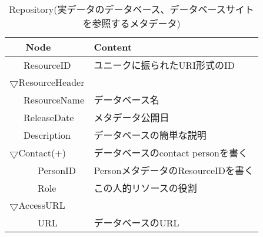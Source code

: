 \begin{table}[ht]
\begin{center}
{\scriptsize
\caption{Repository(実データのデータベース、データベースサイトを参照するメタデータ)}
\begin{tabular}{ll}\hline
\ \ \ Node & Content \\ \hline
\ \ \ ResourceID & ユニークに振られたURI形式のID\\
$\bigtriangledown$ResourceHeader & \\
\ \ \ ResourceName & データベース名\\
\ \ \ ReleaseDate & メタデータ公開日\\
\ \ \ Description & データベースの簡単な説明\\
$\bigtriangledown$Contact(+) & データベースのcontact personを書く\\
\ \ \ \ \ \ PersonID & PersonメタデータのResourceIDを書く\\
\ \ \ \ \ \ Role & この人的リソースの役割\\
$\bigtriangledown$AccessURL & \\
\ \ \ \ \ \ URL & データベースのURL\\ \hline
\end{tabular}
}
\end{center}
\end{table}

